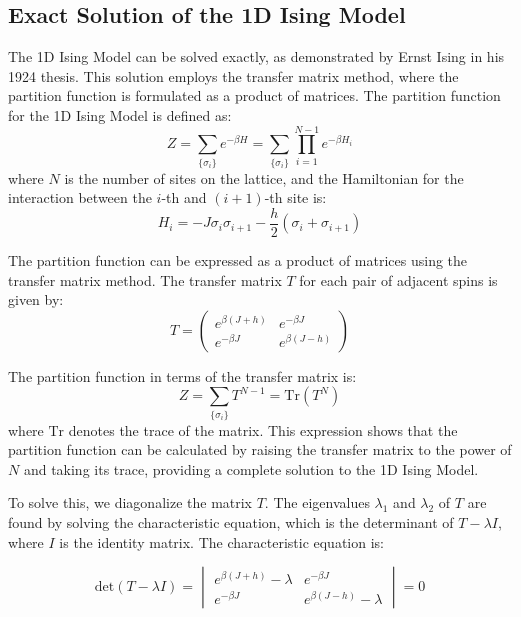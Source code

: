 \subsection{Exact Solution of the 1D Ising Model}
The 1D Ising Model can be solved exactly, as demonstrated by Ernst Ising in his
1924 thesis. This solution employs the transfer matrix method, where the
partition function is formulated as a product of matrices. The partition
function for the 1D Ising Model is defined as:
\begin{equation}
  \label{eq:partition1d}
  Z = \sum_{\{\sigma_i\}} e^{-\beta H} = \sum_{\{\sigma_i\}} \prod_{i=1}^{N-1} e^{-\beta H_i}
\end{equation}
where \( N \) is the number of sites on the lattice, and the Hamiltonian for the
interaction between the \( i \)-th and \( (i+1) \)-th site is:
\begin{equation}
  \label{eq:hamiltonian1d}
  H_i = -J \sigma_i \sigma_{i+1} - \frac{h}{2} (\sigma_i + \sigma_{i+1})
\end{equation}

The partition function can be expressed as a product of matrices using the
transfer matrix method. The transfer matrix \( T \) for each pair of adjacent
spins is given by:
\begin{equation}
  \label{eq:transfer1d}
  T = \begin{pmatrix}
    e^{\beta(J+h)} & e^{-\beta J} \\
    e^{-\beta J} & e^{\beta(J-h)}
  \end{pmatrix}
\end{equation}

The partition function in terms of the transfer matrix is:
\begin{equation}
  \label{eq:partition1dmat2}
  Z = \sum_{\{\sigma_i\}} T^{N-1} = \text{Tr}(T^N)
\end{equation}
where \( \text{Tr} \) denotes the trace of the matrix. This expression shows
that the partition function can be calculated by raising the transfer matrix to
the power of \( N \) and taking its trace, providing a complete solution to the
1D Ising Model.

To solve this, we diagonalize the matrix \( T \). The eigenvalues \( \lambda_1
\) and \( \lambda_2 \) of \( T \) are found by solving the characteristic
equation, which is the determinant of \( T - \lambda I \), where \( I \) is the
identity matrix. The characteristic equation is:

\begin{equation}
\text{det}(T - \lambda I) = \begin{vmatrix}
    e^{\beta(J+h)} - \lambda & e^{-\beta J} \\
    e^{-\beta J} & e^{\beta(J-h)} - \lambda
\end{vmatrix} = 0
\end{equation}

